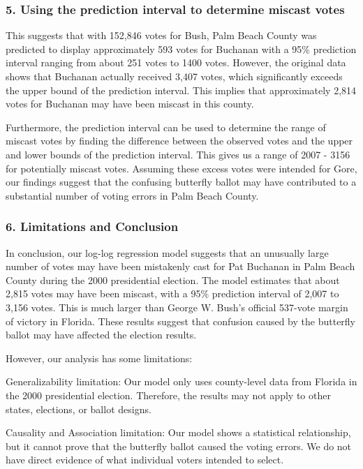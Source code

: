 \documentclass[
  letterpaper,
  DIV=11,
  numbers=noendperiod]{scrartcl}
\begin{document}
\subsubsection{5. Using the prediction interval to determine miscast
votes}\label{using-the-prediction-interval-to-determine-miscast-votes}

This suggests that with 152,846 votes for Bush, Palm Beach County was
predicted to display approximately 593 votes for Buchanan with a 95\%
prediction interval ranging from about 251 votes to 1400 votes. However,
the original data shows that Buchanan actually received 3,407 votes,
which significantly exceeds the upper bound of the prediction interval.
This implies that approximately 2,814 votes for Buchanan may have been
miscast in this county.

Furthermore, the prediction interval can be used to determine the range
of miscast votes by finding the difference between the observed votes
and the upper and lower bounds of the prediction interval. This gives us
a range of 2007 - 3156 for potentially miscast votes. Assuming these
excess votes were intended for Gore, our findings suggest that the
confusing butterfly ballot may have contributed to a substantial number
of voting errors in Palm Beach County.

\subsubsection{6. Limitations and
Conclusion}\label{limitations-and-conclusion}

In conclusion, our log-log regression model suggests that an unusually
large number of votes may have been mistakenly cast for Pat Buchanan in
Palm Beach County during the 2000 presidential election. The model
estimates that about 2,815 votes may have been miscast, with a 95\%
prediction interval of 2,007 to 3,156 votes. This is much larger than
George W. Bush's official 537-vote margin of victory in Florida. These
results suggest that confusion caused by the butterfly ballot may have
affected the election results.

However, our analysis has some limitations:

Generalizability limitation: Our model only uses county-level data from
Florida in the 2000 presidential election. Therefore, the results may
not apply to other states, elections, or ballot designs.

Causality and Association limitation: Our model shows a statistical
relationship, but it cannot prove that the butterfly ballot caused the
voting errors. We do not have direct evidence of what individual voters
intended to select.
\end{document}
